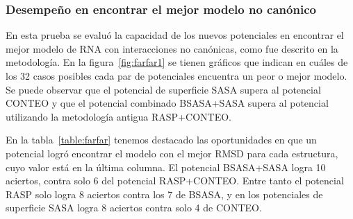 \subsubsection{Desempeño en encontrar el mejor modelo no canónico}
\par
En esta prueba se evaluó la capacidad de los nuevos potenciales en encontrar el mejor modelo de RNA con interacciones no canónicas, como fue descrito en la metodología.
En la figura~\ref{fig:farfar1} se tienen gráficos que indican en cuáles de los 32 casos posibles cada par de potenciales encuentra un peor o mejor modelo. Se puede observar que el potencial de superficie SASA supera al potencial CONTEO y que el potencial combinado BSASA+SASA supera al potencial utilizando la metodología antigua RASP+CONTEO.
\par
En la tabla~\ref{table:farfar} tenemos destacado las oportunidades en que un potencial logró encontrar el modelo con el mejor RMSD para cada estructura, cuyo valor está en la última columna.
El potencial BSASA+SASA logra 10 aciertos, contra solo 6 del potencial RASP+CONTEO.
Entre tanto el potencial RASP solo logra 8 aciertos contra los 7 de BSASA, y en los potenciales de superficie SASA logra 8 aciertos contra solo 4 de CONTEO.

